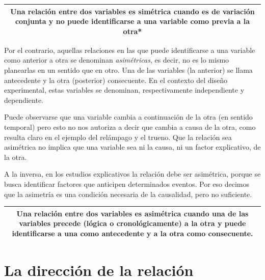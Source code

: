 \documentclass[]{book}
\begin{document}
\begin{longtable}[]{@{}c@{}}
\toprule
\endhead
\begin{minipage}[t]{0.97\columnwidth}\centering
Una relación entre dos variables es \textbf{simétrica} cuando es de variación conjunta y no puede identificarse a una variable como previa a la otra*\strut
\end{minipage}\tabularnewline
\bottomrule
\end{longtable}

Por el contrario, aquellas relaciones en las que puede identificarse a una variable como anterior a otra se denominan \emph{asimétricas}, es
decir, no es lo mismo planearlas en un sentido que en otro. Una de las
variables (la anterior) se llama antecedente y la otra (posterior)
consecuente. En el contexto del diseño experimental, estas variables se denominan, respectivamente independiente y dependiente.

Puede observarse que una variable cambia a continuación de la otra (en
sentido temporal) pero esto no nos autoriza a decir que cambia a causa
de la otra, como resulta claro en el ejemplo del relámpago y el trueno.
Que la relación sea asimétrica no implica que una variable sea ni la
causa, ni un factor explicativo, de la otra.

A la inversa, en los estudios explicativos la relación debe ser
asimétrica, porque se busca identificar factores que anticipen
determinados eventos. Por eso decimos que la asimetría es una condición
necesaria de la causalidad, pero no suficiente.

\begin{longtable}[]{@{}c@{}}
\toprule
\endhead
\begin{minipage}[t]{0.97\columnwidth}\centering
Una relación entre dos variables es \textbf{asimétrica} cuando una de las variables precede (lógica o cronológicamente) a la otra y puede identificarse a una como antecedente y a la otra como consecuente.\strut
\end{minipage}\tabularnewline
\bottomrule
\end{longtable}

\hypertarget{la-direccion-de-la-relacion}{%
\section{La dirección de la relación}\label{la-direccion-de-la-relacion}}
\end{document}
